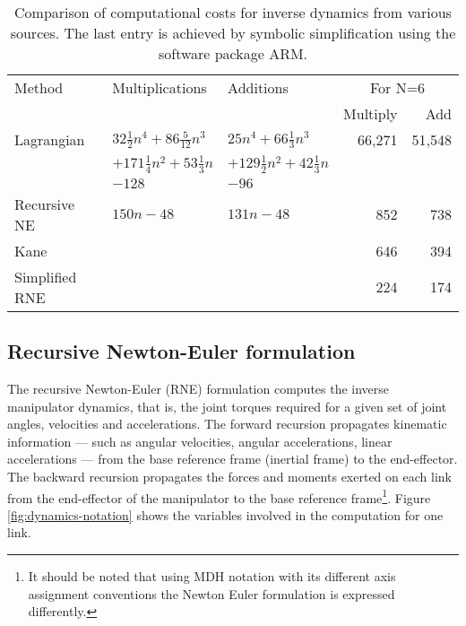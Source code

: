 \documentclass{article}
\begin{document}
\begin{table}
\centering
\begin{tabular}{|l|l|l||r|r|} \hline
Method &        Multiplications & Additions & \multicolumn{2}{c|}{For N=6}
\\ \cline{4-5}
       &                        &           & Multiply & Add \\ \hline
Lagrangian\cite{Hollerbach80} &
	$32\frac{1}{2}n^4 + 86\frac{5}{12}n^3$ &
	$25n^4 + 66\frac{1}{3}n^3$ &
	66,271 & 51,548 \\
    &   $+ 171\frac{1}{4}n^2 + 53\frac{1}{3}n$  &
	$+ 129\frac{1}{2}n^2 + 42\frac{1}{3}n$ & & \\
     &  $-128$ &  $-96$ & & \\
Recursive NE\cite{Hollerbach80} &
	$150n - 48$     & $131n-48$     & 852 & 738     \\
Kane\cite{Kane83} &                  &               & 646 & 394     \\
Simplified RNE\cite{Murray84} &                &               & 224 & 174     \\ \hline
\end{tabular}
\caption[Comparison of computational costs for inverse dynamics.]{Comparison 
of computational costs for inverse dynamics from various sources.  The last
entry is achieved by symbolic simplification using the software package ARM.}
\label{tab:dyn-costs}
\end{table}


\subsection{Recursive Newton-Euler formulation}\label{sec:robot-control}
The recursive Newton-Euler (RNE) formulation\cite{Luh80a}
computes the inverse manipulator dynamics, that is, the joint torques
required for a given set of joint angles, velocities and accelerations.
The forward recursion propagates kinematic information --- such as
angular velocities, angular accelerations, linear accelerations --- from the base
reference frame (inertial frame) to the end-effector.  The backward
recursion propagates the forces and moments exerted on each link from
the end-effector of the manipulator to the base reference frame\footnote{It 
should be noted that using MDH notation with its different
axis assignment conventions the Newton Euler formulation is expressed
differently\cite{Craig89}.}.
Figure \ref{fig:dynamics-notation} shows the variables involved in the
computation for one link.
\end{document}
